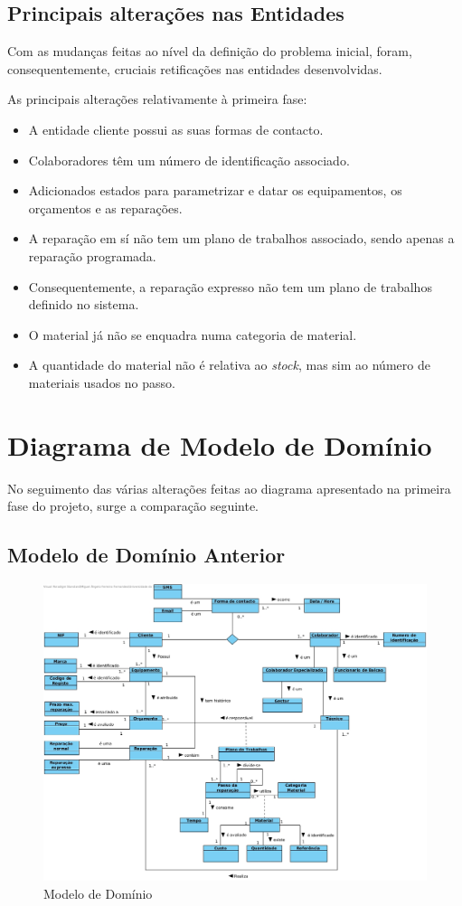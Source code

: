 \documentclass[a4paper,12pt]{scrreprt}
\begin{document}
\subsection{Principais alterações nas Entidades}
Com as mudanças feitas ao nível da definição do problema inicial, foram, consequentemente, cruciais retificações nas entidades
desenvolvidas.

As principais alterações relativamente à primeira fase: 
\begin{itemize}
    \item A entidade cliente possui as suas formas de contacto.
    \item Colaboradores têm um número de identificação associado. 
    \item Adicionados estados para parametrizar e datar os equipamentos, os orçamentos e as reparações.
    \item A reparação em sí não tem um plano de trabalhos associado, sendo apenas a reparação programada.
    \item Consequentemente, a reparação expresso não tem um plano de trabalhos definido no sistema.
    \item O material já não se enquadra numa categoria de material.
    \item A quantidade do material não é relativa ao \textit{stock}, mas sim ao número de materiais usados no passo.
\end{itemize}

\section{Diagrama de Modelo de Domínio}

No seguimento das várias alterações feitas ao diagrama apresentado na primeira fase do projeto, surge a comparação seguinte.

\subsection{Modelo de Domínio Anterior} 

\begin{figure}[!ht]
    \centering
    \includegraphics[scale=0.40]{Modeloinicial.jpg}
    \caption{Modelo de Domínio}
\end{figure}
\end{document}
